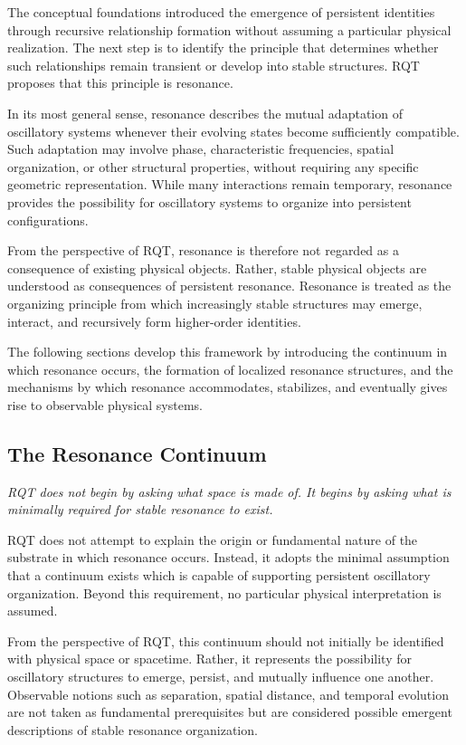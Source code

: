 \documentclass[11pt,a4paper]{article}
\begin{document}
The conceptual foundations introduced the emergence of persistent identities through recursive relationship formation without assuming a particular physical realization. The next step is to identify the principle that determines whether such relationships remain transient or develop into stable structures. RQT proposes that this principle is resonance.

In its most general sense, resonance describes the mutual adaptation of oscillatory systems whenever their evolving states become sufficiently compatible. Such adaptation may involve phase, characteristic frequencies, spatial organization, or other structural properties, without requiring any specific geometric representation. While many interactions remain temporary, resonance provides the possibility for oscillatory systems to organize into persistent configurations.

From the perspective of RQT, resonance is therefore not regarded as a consequence of existing physical objects. Rather, stable physical objects are understood as consequences of persistent resonance. Resonance is treated as the organizing principle from which increasingly stable structures may emerge, interact, and recursively form higher-order identities.

The following sections develop this framework by introducing the continuum in which resonance occurs, the formation of localized resonance structures, and the mechanisms by which resonance accommodates, stabilizes, and eventually gives rise to observable physical systems.


\subsection{The Resonance Continuum}

\emph{RQT does not begin by asking what space is made of. It begins by asking what is minimally required for stable resonance to exist.}
\vspace{0.6em} 

\noindent
RQT does not attempt to explain the origin or fundamental nature of the substrate in which resonance occurs. Instead, it adopts the minimal assumption that a continuum exists which is capable of supporting persistent oscillatory organization. Beyond this requirement, no particular physical interpretation is assumed.

From the perspective of RQT, this continuum should not initially be identified with physical space or spacetime. Rather, it represents the possibility for oscillatory structures to emerge, persist, and mutually influence one another. Observable notions such as separation, spatial distance, and temporal evolution are not taken as fundamental prerequisites but are considered possible emergent descriptions of stable resonance organization.
\end{document}
